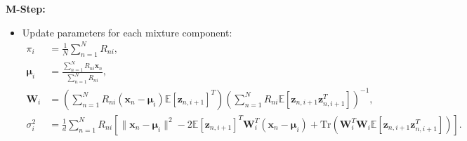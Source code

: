 \documentclass{beamer}
\begin{document}
    \begin{frame}
    
\textbf{M-Step:}
\begin{itemize}
    \item Update parameters for each mixture component:
    \begin{align*}
        \pi_i &= \frac{1}{N} \sum_{n=1}^N R_{ni}, \\
        \boldsymbol{\mu}_i &= \frac{\sum_{n=1}^N R_{ni} \mathbf{x}_n}{\sum_{n=1}^N R_{ni}}, \\
        \mathbf{W}_i &= \left(\sum_{n=1}^N R_{ni} (\mathbf{x}_n - \boldsymbol{\mu}_i) \mathbb{E}[\mathbf{z}_{n,i+1}]^T\right) \left(\sum_{n=1}^N R_{ni} \mathbb{E}[\mathbf{z}_{n,i+1} \mathbf{z}_{n,i+1}^T]\right)^{-1}, \\
        \sigma_i^2 &= \frac{1}{d} \sum_{n=1}^N R_{ni} \left[ \|\mathbf{x}_n - \boldsymbol{\mu}_i\|^2 - 2 \mathbb{E}[\mathbf{z}_{n,i+1}]^T \mathbf{W}_i^T (\mathbf{x}_n - \boldsymbol{\mu}_i) + \text{Tr}(\mathbf{W}_i^T \mathbf{W}_i \mathbb{E}[\mathbf{z}_{n,i+1} \mathbf{z}_{n,i+1}^T]) \right].
    \end{align*}
\end{itemize}
    \end{frame}
\end{document}
